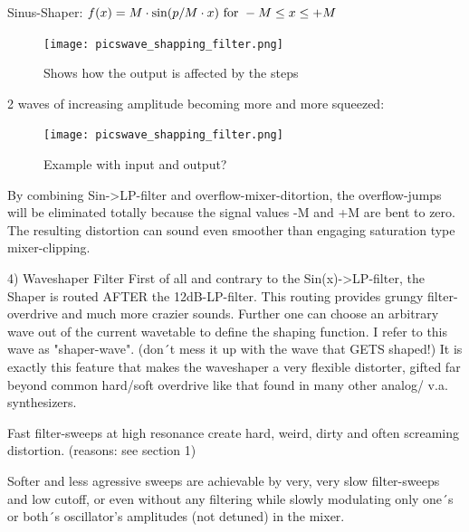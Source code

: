 	Sinus-Shaper: $f(x) = M \cdot \sin(p /M \cdot x) \text{ for } -M \leq x \leq +M$
	\bigskip %
	\begin{figure}[ht!]
		\centering
		\texttt{[image: picswave\_shapping\_filter.png]}
		\caption{Shows how the output is affected by the steps}
		\label{mixer_clipping}
	\end{figure}
	\begin{example}
		2 waves of increasing amplitude becoming more and more squeezed:
		\bigskip %
		\begin{figure}[ht!]
			\centering
			\texttt{[image: picswave\_shapping\_filter.png]}
			\caption{Example with input and output?}
			\label{mixer_clipping}
		\end{figure}
	\end{example}
	By combining Sin->LP-filter and overflow-mixer-ditortion, the overflow-jumps will be eliminated totally because the signal values -M and +M are bent to zero. The resulting distortion can sound even smoother than engaging saturation type mixer-clipping.
	
	4) Waveshaper Filter
	First of all and contrary to the Sin(x)->LP-filter, the Shaper is routed AFTER the 12dB-LP-filter. This routing provides grungy filter-overdrive and much more crazier sounds. Further one can choose an arbitrary wave out of the current wavetable to define the shaping function. I refer to this wave as "shaper-wave". (don´t mess it up with the wave that GETS shaped!) It is exactly this feature that makes the waveshaper a very flexible distorter, gifted far beyond common hard/soft overdrive like that found in many other analog/ v.a. synthesizers.
	
	Fast filter-sweeps at high resonance create hard, weird, dirty and often screaming distortion. (reasons: see section 1)
	
	Softer and less agressive sweeps are achievable by very, very slow filter-sweeps and low cutoff, or even without any filtering while slowly modulating only one´s or both´s oscillator's amplitudes (not detuned) in the mixer.
	
